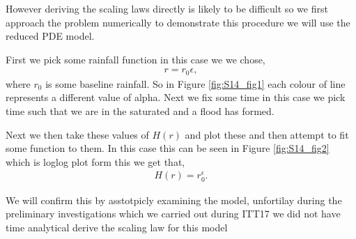 \documentclass[11pt]{article}
\begin{document}
\vspace{3pt}
\noindent\begin{minipage}{0.53\textwidth}
    \qquad However deriving the scaling laws directly is likely to be difficult so we first approach the problem numerically to demonstrate this procedure we will use the reduced PDE model. 
    
    \qquad First we pick some rainfall function in this case we we chose, \begin{align}
        r = r_0\epsilon,
    \end{align}
    where $r_0$ is some baseline rainfall. So in Figure \ref{fig:S14_fig1} each colour of line represents a different value of alpha. Next we fix some time in this case we pick time such that we are in the saturated and a flood has formed. 
    
    \qquad Next we then take these values of $H(r)$ and plot these and then attempt to fit some function to them. In this case this can be seen in Figure \ref{fig:S14_fig2} which is loglog plot form this we get that, \begin{align}
    H(r)=r_0^{\epsilon}.
    \end{align}
    
    \qquad We will confirm this by asstotpicly examining the model, unfortilay during the preliminary investigations which we carried out during ITT17 we did not have time analytical derive the scaling law for this model
    \end{minipage}
\hspace{0.05\textwidth}
\end{document}
